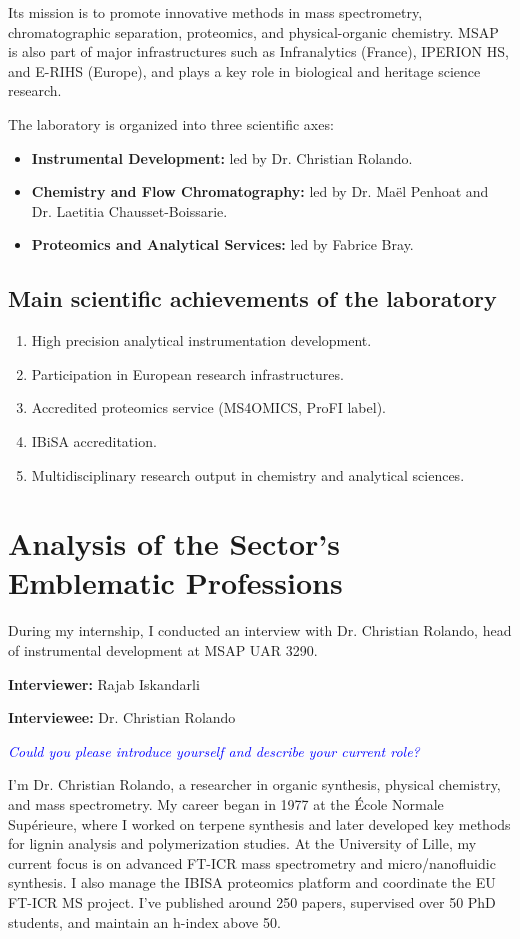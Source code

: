 \documentclass[12pt,a4paper]{report}
\newcommand{\question}[1]{\par\noindent\textcolor{blue}{\textit{#1}}\par}
\newcommand{\answer}[1]{\noindent #1\par\vspace{0.6em}}
\begin{document}
Its mission is to promote innovative methods in mass spectrometry, chromatographic separation, proteomics, and physical-organic chemistry. MSAP is also part of major infrastructures such as Infranalytics (France), IPERION HS, and E-RIHS (Europe), and plays a key role in biological and heritage science research.

The laboratory is organized into three scientific axes:

\begin{itemize}
\item \textbf{Instrumental Development:} led by Dr. Christian Rolando.
\item \textbf{Chemistry and Flow Chromatography:} led by Dr. Maël Penhoat and Dr. Laetitia Chausset-Boissarie.
\item \textbf{Proteomics and Analytical Services:} led by Fabrice Bray.
\end{itemize}

\subsection{Main scientific achievements of the laboratory}

\begin{enumerate}
\item High precision analytical instrumentation development.
\item Participation in European research infrastructures.
\item Accredited proteomics service (MS4OMICS, ProFI label).
\item IBiSA accreditation.
\item Multidisciplinary research output in chemistry and analytical sciences.
\end{enumerate}

\section{Analysis of the Sector’s Emblematic Professions}

During my internship, I conducted an interview with Dr. Christian Rolando, head of instrumental development at MSAP UAR 3290.

\textbf{Interviewer:} Rajab Iskandarli

\textbf{Interviewee:} Dr. Christian Rolando

\bigskip

\question{Could you please introduce yourself and describe your current role?}
\answer{I’m Dr. Christian Rolando, a researcher in organic synthesis, physical chemistry, and mass spectrometry. My career began in 1977 at the École Normale Supérieure, where I worked on terpene synthesis and later developed key methods for lignin analysis and polymerization studies. At the University of Lille, my current focus is on advanced FT-ICR mass spectrometry and micro/nanofluidic synthesis. I also manage the IBISA proteomics platform and coordinate the EU FT-ICR MS project. I’ve published around 250 papers, supervised over 50 PhD students, and maintain an h-index above 50.}
\end{document}

